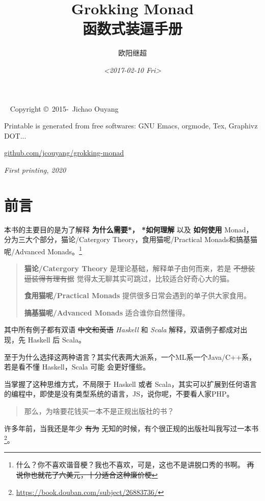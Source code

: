 \documentclass[letterspacing]{tufte-book}
\author{欧阳继超}
\date{\textit{<2017-02-10 Fri>}}
\title{Grokking Monad\\\medskip
\large 函数式装逼手册}
\begin{document}
\maketitle
\tableofcontents

\newpage
\begin{fullwidth}
~\vfill
\thispagestyle{empty}
\setlength{\parindent}{0pt}
\setlength{\parskip}{\baselineskip}
Copyright \copyright\ 2015-\the\year\ Jichao Ouyang

Printable is generated from free softwares: GNU Emacs, orgmode, Tex, Graphivz DOT...
\par\url{github.com/jcouyang/grokking-monad}

\par\textit{First printing, 2020}
\end{fullwidth}

\chapter*{前言}
本书的主要目的是为了解释 \textbf{为什么需要*， *如何理解} 以及 \textbf{如何使用} Monad，
分为三大个部分，猫论/Catergory Theory，食用猫呢/Practical Monads和搞基猫呢/Advanced Monads。\footnote{什么？你不喜欢谐音梗？我也不喜欢，可是，这也不是讲脱口秀的书啊。 \sout{再说你也就花了六美元，十分适合这种廉价梗}}

\begin{quote}
\textbf{猫论/Catergory Theory} 是理论基础，解释单子由何而来，若是 \sout{不想装逼装得有理有据} 觉得太无聊其实可跳过，比较适合好奇心大的猫。

\textbf{食用猫呢/Practical Monads} 提供很多日常会遇到的单子供大家食用。

\textbf{搞基猫呢/Advanced Monads} 适合谁你自然懂得。
\end{quote}

其中所有例子都有双语 \sout{中文和英语} \emph{Haskell} 和 \emph{Scala} 解释，双语例子都成对出现，先 Haskell 后 Scala。

至于为什么选择这两种语言？其实代表两大派系，一个ML系一个Java/C++系，若是看不懂 Haskell，Scala 可能
会更好懂些。

当掌握了这种思维方式，不局限于 Haskell 或者 Scala，其实可以扩展到任何语言的编程中，即使是没有类型系统的语言，JS，说你呢，不要看人家PHP。

\begin{quote}
那么，为啥要花钱买一本不是正规出版社的书？
\end{quote}

许多年前，当我还是年少 \sout{有为} 无知的时候，有个很正规的出版社叫我写过一本书\footnote{\url{https://book.douban.com/subject/26883736/}}。
\end{document}
